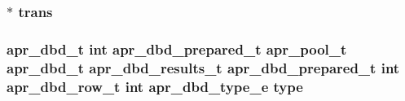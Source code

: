 \subsubsection[{\texorpdfstring{trans}{trans}}]{ $\ast$ trans}\hypertarget{group__APR__Util__DBD_ga135dae7b88ae03090c5a7f638f980f24}{}\label{group__APR__Util__DBD_ga135dae7b88ae03090c5a7f638f980f24}
\subsubsection[{\texorpdfstring{type}{type}}]{ {\bf apr\+\_\+dbd\+\_\+t} {\bf int} {\bf apr\+\_\+dbd\+\_\+prepared\+\_\+t} {\bf apr\+\_\+pool\+\_\+t} {\bf apr\+\_\+dbd\+\_\+t} {\bf apr\+\_\+dbd\+\_\+results\+\_\+t} {\bf apr\+\_\+dbd\+\_\+prepared\+\_\+t} {\bf int} {\bf apr\+\_\+dbd\+\_\+row\+\_\+t} {\bf int} {\bf apr\+\_\+dbd\+\_\+type\+\_\+e} type}\hypertarget{group__APR__Util__DBD_ga4b065e6ae492dbb7bcd294e8d378f807}{}\label{group__APR__Util__DBD_ga4b065e6ae492dbb7bcd294e8d378f807}
